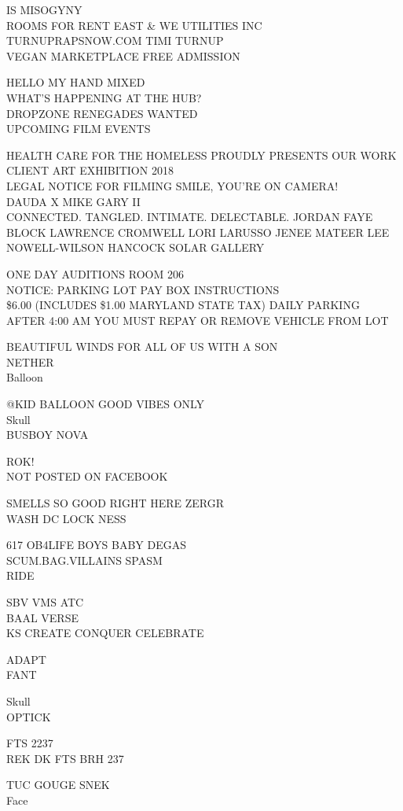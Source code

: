\documentclass[10pt,letterpaper]{article}
\begin{document}
IS MISOGYNY\\
ROOMS FOR RENT EAST \& WE UTILITIES INC\\
TURNUPRAPSNOW.COM TIMI TURNUP\\
VEGAN MARKETPLACE FREE ADMISSION

HELLO MY HAND MIXED\\
WHAT'S HAPPENING AT THE HUB?\\
DROPZONE RENEGADES WANTED\\
UPCOMING FILM EVENTS

HEALTH CARE FOR THE HOMELESS PROUDLY PRESENTS OUR WORK CLIENT ART EXHIBITION 2018\\
LEGAL NOTICE FOR FILMING SMILE, YOU'RE ON CAMERA!\\
DAUDA X MIKE GARY II\\
CONNECTED.  TANGLED.  INTIMATE.  DELECTABLE.  JORDAN FAYE BLOCK LAWRENCE CROMWELL LORI LARUSSO JENEE MATEER LEE NOWELL{-}WILSON HANCOCK SOLAR GALLERY

ONE DAY AUDITIONS ROOM 206\\
NOTICE: PARKING LOT PAY BOX INSTRUCTIONS\\
\$6.00 (INCLUDES \$1.00 MARYLAND STATE TAX) DAILY PARKING AFTER 4:00 AM YOU MUST REPAY OR REMOVE VEHICLE FROM LOT

BEAUTIFUL WINDS FOR ALL OF US WITH A SON\\
NETHER\\
Balloon

@KID BALLOON GOOD VIBES ONLY\\
Skull\\
BUSBOY NOVA

ROK!\\
NOT POSTED ON FACEBOOK

SMELLS SO GOOD RIGHT HERE ZERGR\\
WASH DC LOCK NESS

617 OB4LIFE BOYS BABY DEGAS\\
SCUM.BAG.VILLAINS SPASM\\
RIDE

SBV VMS ATC\\
BAAL VERSE\\
KS CREATE CONQUER CELEBRATE

ADAPT\\
FANT

Skull\\
OPTICK

FTS 2237\\
REK DK FTS BRH 237

TUC GOUGE SNEK\\
Face
\end{document}
